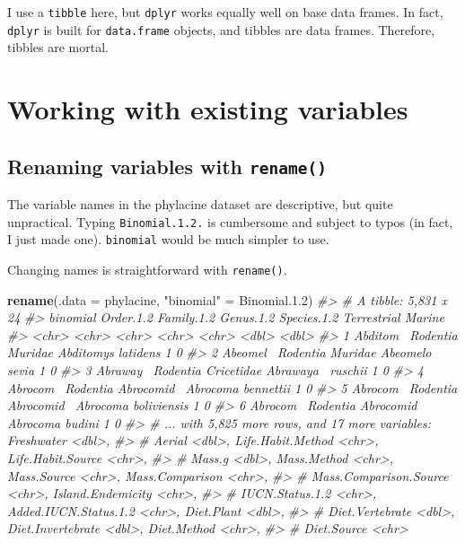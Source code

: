 \documentclass[]{book}
\newenvironment{Shaded}{}{}
\newcommand{\CommentTok}[1]{\textcolor[rgb]{0.38,0.63,0.69}{\textit{#1}}}
\newcommand{\DataTypeTok}[1]{\textcolor[rgb]{0.56,0.13,0.00}{#1}}
\newcommand{\FloatTok}[1]{\textcolor[rgb]{0.25,0.63,0.44}{#1}}
\newcommand{\KeywordTok}[1]{\textcolor[rgb]{0.00,0.44,0.13}{\textbf{#1}}}
\newcommand{\NormalTok}[1]{#1}
\newcommand{\StringTok}[1]{\textcolor[rgb]{0.25,0.44,0.63}{#1}}
\begin{document}
I use a \texttt{tibble} here, but \texttt{dplyr} works equally well on base data frames. In
fact, \texttt{dplyr} is built for \texttt{data.frame} objects, and tibbles are data frames.
Therefore, tibbles are mortal.

\hypertarget{working-with-existing-variables}{%
\section{Working with existing variables}\label{working-with-existing-variables}}

\hypertarget{renaming-variables-with-rename}{%
\subsection{\texorpdfstring{Renaming variables with \texttt{rename()}}{Renaming variables with rename()}}\label{renaming-variables-with-rename}}

The variable names in the phylacine dataset are descriptive, but quite unpractical. Typing
\texttt{Binomial.1.2.} is cumbersome and subject to typos (in fact, I just made one).
\texttt{binomial} would be much simpler to use.

Changing names is straightforward with \texttt{rename()}.

\begin{Shaded}
\begin{Highlighting}[]
\KeywordTok{rename}\NormalTok{(}\DataTypeTok{.data =}\NormalTok{ phylacine, }\StringTok{"binomial"}\NormalTok{ =}\StringTok{ }\NormalTok{Binomial.}\FloatTok{1.2}\NormalTok{)}
\CommentTok{#> # A tibble: 5,831 x 24}
\CommentTok{#>   binomial Order.1.2 Family.1.2 Genus.1.2 Species.1.2 Terrestrial Marine}
\CommentTok{#>   <chr>    <chr>     <chr>      <chr>     <chr>             <dbl>  <dbl>}
\CommentTok{#> 1 Abditom~ Rodentia  Muridae    Abditomys latidens              1      0}
\CommentTok{#> 2 Abeomel~ Rodentia  Muridae    Abeomelo~ sevia                 1      0}
\CommentTok{#> 3 Abraway~ Rodentia  Cricetidae Abrawaya~ ruschii               1      0}
\CommentTok{#> 4 Abrocom~ Rodentia  Abrocomid~ Abrocoma  bennettii             1      0}
\CommentTok{#> 5 Abrocom~ Rodentia  Abrocomid~ Abrocoma  boliviensis           1      0}
\CommentTok{#> 6 Abrocom~ Rodentia  Abrocomid~ Abrocoma  budini                1      0}
\CommentTok{#> # ... with 5,825 more rows, and 17 more variables: Freshwater <dbl>,}
\CommentTok{#> #   Aerial <dbl>, Life.Habit.Method <chr>, Life.Habit.Source <chr>,}
\CommentTok{#> #   Mass.g <dbl>, Mass.Method <chr>, Mass.Source <chr>, Mass.Comparison <chr>,}
\CommentTok{#> #   Mass.Comparison.Source <chr>, Island.Endemicity <chr>,}
\CommentTok{#> #   IUCN.Status.1.2 <chr>, Added.IUCN.Status.1.2 <chr>, Diet.Plant <dbl>,}
\CommentTok{#> #   Diet.Vertebrate <dbl>, Diet.Invertebrate <dbl>, Diet.Method <chr>,}
\CommentTok{#> #   Diet.Source <chr>}
\end{Highlighting}
\end{Shaded}
\end{document}
